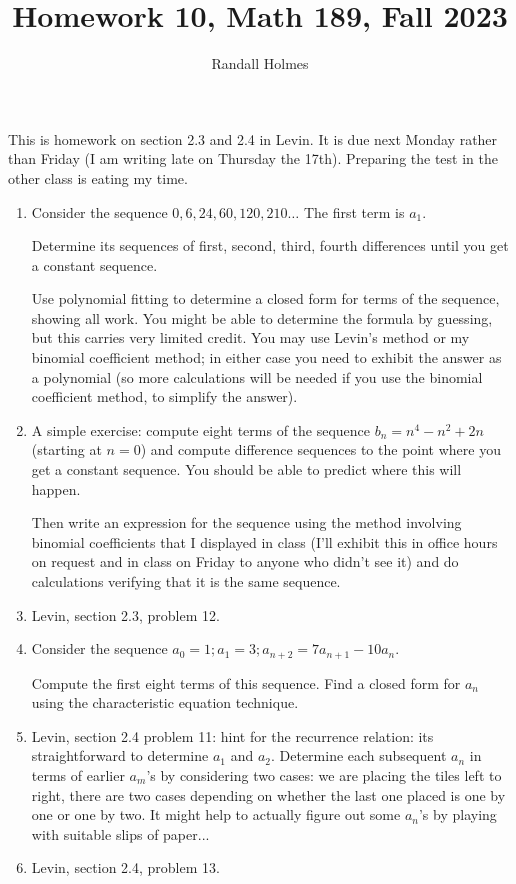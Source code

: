 \documentclass[12pt]{article}
\title{Homework 10, Math 189, Fall 2023}
\author{Randall Holmes}
\begin{document}
\maketitle

This is homework on section 2.3 and 2.4 in Levin.  It is due next Monday rather than Friday (I am writing late on Thursday the 17th).   Preparing the test in the other class is eating my time.

\begin{enumerate}

\item   Consider the sequence $0, 6, 24, 60, 120, 210\ldots$  The first term is $a_1$.

Determine its sequences of first, second, third, fourth differences until you get a constant sequence.

Use polynomial fitting to determine a closed form for terms of the sequence, showing all work.   You might be able to determine the formula by guessing, but this carries very limited credit.
You may use Levin's method or my binomial coefficient method;  in either case you need to exhibit the answer as a polynomial (so more calculations will be needed if you use the binomial coefficient method, to simplify the answer).

\item   A simple exercise:  compute eight terms of the sequence $b_n = n^4-n^2+2n$ (starting at $n=0$) and compute difference sequences to the point where you get a constant sequence.  You should be able to predict where this will happen.  

Then write an expression for the sequence using the method involving binomial coefficients that I displayed in class (I'll exhibit this in office hours on request and in class on Friday to anyone who didn't see it) and do calculations verifying that it is the same sequence.

\item  Levin, section 2.3, problem 12.

\item  Consider the sequence $a_0=1; a_1 = 3;a_{n+2} = 7a_{n+1}-10a_n$.

Compute the first eight terms of this sequence.  Find a closed form for $a_n$ using the characteristic equation technique.


\item  Levin, section 2.4 problem 11:  hint for the recurrence relation:  its straightforward to determine $a_1$ and $a_2$.  Determine each subsequent $a_n$ in terms of earlier $a_m$'s by considering two cases:  we are placing the tiles left to right, there are two cases depending on whether the last one placed is one by one or one by two.  It might help to actually figure out some $a_n$'s by playing with suitable slips of paper...

\item   Levin, section 2.4, problem 13.

\end{enumerate}
\end{document}
